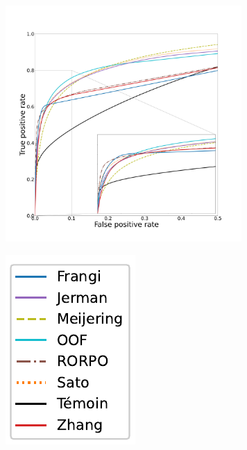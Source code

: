 \begin{figure}[!ht]
  \captionsetup[subfigure]{justification=centering}
  \centering
  \begin{subfigure}[t]{0.78\textwidth}
    \centering
  \includegraphics[clip = true, trim  =  125 125 180 200, height=9cm]{Images/Bullitt_ROC.pdf}
  \end{subfigure}
  \begin{subfigure}[t]{0.2\textwidth}
    \includegraphics[width=\textwidth,clip = true]{Images/standAloneLegend.pdf}

\end{subfigure}
\end{figure}
